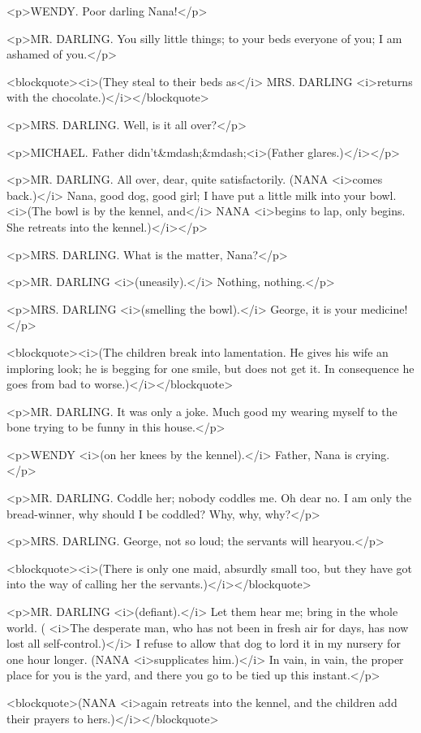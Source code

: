 <p>WENDY. Poor darling Nana!</p>

<p>MR. DARLING. You silly little things; to your beds everyone of
you; I am ashamed of you.</p>

<blockquote><i>(They steal to their beds as</i> MRS. DARLING
<i>returns with the chocolate.)</i></blockquote>

<p>MRS. DARLING. Well, is it all over?</p>

<p>MICHAEL. Father didn't&mdash;&mdash;<i>(Father glares.)</i></p>

<p>MR. DARLING. All over, dear, quite satisfactorily. (NANA <i>comes
back.)</i> Nana, good dog, good girl; I have put a little milk into
your bowl. <i>(The bowl is by the kennel, and</i> NANA <i>begins to
lap, only begins. She retreats into the kennel.)</i></p>

<p>MRS. DARLING. What is the matter, Nana?</p>

<p>MR. DARLING <i>(uneasily).</i> Nothing, nothing.</p>

<p>MRS. DARLING <i>(smelling the bowl).</i> George, it is your
medicine!</p>

<blockquote><i>(The children break into lamentation. He gives his
wife an imploring look; he is begging for one smile, but does not get
it. In consequence he goes from bad to worse.)</i></blockquote>

<p>MR. DARLING. It was only a joke. Much good my wearing myself to
the bone trying to be funny in this house.</p>

<p>WENDY <i>(on her knees by the kennel).</i> Father, Nana is
crying.</p>

<p>MR. DARLING. Coddle her; nobody coddles me. Oh dear no. I am only
the bread-winner, why should I be coddled? Why, why, why?</p>

<p>MRS. DARLING. George, not so loud; the servants will hearyou.</p>

<blockquote><i>(There is only one maid, absurdly small too, but they
have got into the way of calling her the servants.)</i></blockquote>

<p>MR. DARLING <i>(defiant).</i> Let them hear me; bring in the whole
world. ( <i>The desperate man, who has not been in fresh air for
days, has now lost all self-control.)</i> I refuse to allow that dog
to lord it in my nursery for one hour longer. (NANA <i>supplicates
him.)</i> In vain, in vain, the proper place for you is the yard, and
there you go to be tied up this instant.</p>

<blockquote>(NANA <i>again retreats into the kennel, and the children
add their prayers to hers.)</i></blockquote>

